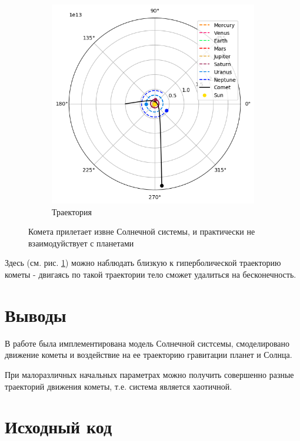 \begin{figure}[H]
\begin{subfigure}{0.49\linewidth}
		\includegraphics[width=1\linewidth]{imgs_8/trjRunBy.png}
		\caption{Траектория}
    \end{subfigure}
	\caption{Комета прилетает извне Солнечной системы, и практически
	не взаимодуйствует с планетами}
    \label{fig:RunBy}
\end{figure}
Здесь (см. рис. \ref{fig:RunBy}) можно наблюдать близкую к гиперболической траекторию кометы -
двигаясь по такой траектории тело сможет удалиться на бесконечность.

\section{Выводы}
В работе была имплементирована модель Солнечной систсемы, смоделировано движение кометы
и воздействие на ее траекторию гравитации планет и Солнца. 

При малоразличных начальных параметрах можно получить совершенно разные траекторий движения кометы,
т.е. система является хаотичной.


\newpage
\section{Исходный код}





